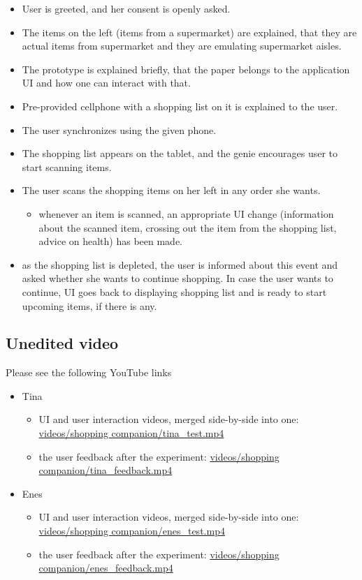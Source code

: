 \begin{itemize}
	\item User is greeted, and her consent is openly asked.
	\item The items on the left (items from a supermarket) are explained, that they are actual items from supermarket and they are emulating supermarket aisles.
	\item The prototype is explained briefly, that the paper belongs to the application UI and how one can interact with that.
	\item Pre-provided cellphone with a shopping list on it is explained to the user.
	\item The user synchronizes using the given phone.
	\item The shopping list appears on the tablet, and the genie encourages user to start scanning items.
	\item The user scans the shopping items on her left in any order she wants.
		\begin{itemize}
			\item whenever an item is scanned, an appropriate UI change (information about the scanned item, crossing out the item from the shopping list, advice on health) has been made.
		\end{itemize}
	\item as the shopping list is depleted, the user is informed about this event and asked whether she wants to continue shopping. In case the user wants to continue, UI goes back to displaying shopping list and is ready to start upcoming items, if there is any.
\end{itemize}

\subsection{Unedited video}
Please see the following YouTube links
\begin{itemize}
	\item Tina
		\begin{itemize}
			\item UI and user interaction videos, merged side-by-side into one: \url{videos/shopping companion/tina_test.mp4}
			
			\item the user feedback after the experiment: \url{videos/shopping companion/tina_feedback.mp4}
		\end{itemize}
	
	\item Enes
	\begin{itemize}
		\item UI and user interaction videos, merged side-by-side into one: \url{videos/shopping companion/enes_test.mp4}
		
		\item the user feedback after the experiment: \url{videos/shopping companion/enes_feedback.mp4}
	\end{itemize}
\end{itemize}

